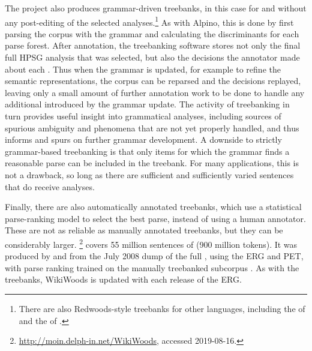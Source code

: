 \documentclass[output=paper,biblatex,babelshorthands,newtxmath,draftmode,colorlinks,citecolor=brown]{langscibook}
\begin{document}
The  project \citep{OFTM2004a-u} also produces grammar-driven treebanks, in this case
for  and without any post-editing of the selected analyses.\footnote{There are also
  Redwoods-style treebanks for other languages, including the  of
   \citep{bond:etal:2004} and the  of 
  \citep{marimon:2015}.}  As with Alpino, this is done by first parsing the corpus with the grammar
and calculating the discriminants for each parse forest.  After annotation, the treebanking software
stores not only the final full HPSG analysis that was selected, but also the decisions the
annotator made about each .  Thus when the grammar is updated, for
example to refine the semantic representations, the corpus can be reparsed and the decisions
replayed, leaving only a small amount of further annotation work to be done to handle any additional
 introduced by the grammar update.  The activity of treebanking in turn provides
useful insight into grammatical analyses, including sources of spurious
ambiguity and phenomena that are not yet properly handled, and thus informs
and spurs on further grammar development.  A downside to strictly grammar-based treebanking is that
only items for which the grammar finds a reasonable parse can be included in the treebank. For many
applications, this is not a drawback, so long as there are sufficient and sufficiently varied
sentences that do receive analyses.

Finally, there are also automatically annotated treebanks, which use a statistical parse-ranking model to select the best parse, instead of using a human annotator.  These are not as reliable as manually annotated treebanks, but they can be considerably larger.  \footnote{\url{http://moin.delph-in.net/WikiWoods}, accessed 2019-08-16.}  covers 55 million sentences of  (900 million tokens).  It was produced by \citet{flickinger2010wikiwoods} and \citet{solberg2012wikiwoods} from the July 2008 dump of the full  , using the ERG and PET, with parse ranking trained on the manually treebanked subcorpus  \citep{ytrestol2009wescience}.  As with the  treebanks, WikiWoods is updated with each release of the ERG.%
%
%
%
%
%
\end{document}
